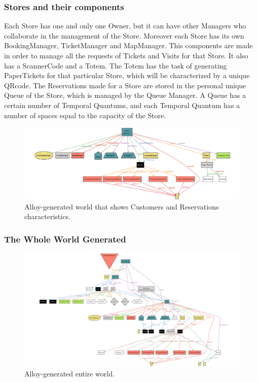 \documentclass[a4paper, 10pt, oneside]{article}
\begin{document}
\subsubsection{Stores and their components}
Each Store has one and only one Owner, but it can have other Managers who collaborate in the management of the Store. Moreover each Store has its own BookingManager, TicketManager and MapManager. This components are made in order to manage all the requests of Tickets and Visits for that Store. It also has a ScannerCode and a Totem. The Totem has the task of generating PaperTickets for that particular Store, which will be characterized by a unique QRcode. The Reservations made for a Store are stored in the personal unique Queue of the Store, which is managed by the Queue Manager. A Queue has a certain number of Temporal Quantums, and each Temporal Quantum has a number of spaces equal to the capacity of the Store.
\begin{figure}[h!]
\centering
	\centering
  	\includegraphics[height=0.23\textheight, scale=0.3, keepaspectratio]{img/alloy/alloy_store.png}
	\caption{Alloy-generated world that shows Customers and Reservations characteristics.}
 	\label{alloy_customer}
\end{figure}

\subsubsection{The Whole World Generated}
\begin{figure}[h!]
\centering
	\centering
  	\includegraphics[height=0.35\textheight, scale=0.3, keepaspectratio]{img/alloy/alloy_entire_world.png}
	\caption{Alloy-generated entire world.}
 	\label{alloy_entire_world}
\end{figure}
\end{document}
